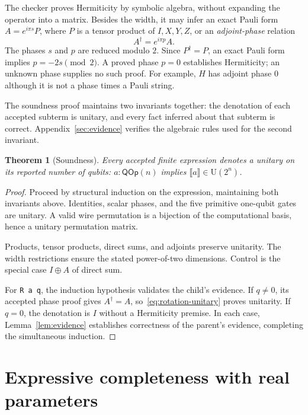 \documentclass[11pt,a4paper]{article}
\newcommand{\U}{\mathrm U}
\newcommand{\sem}[1]{\llbracket #1\rrbracket}
\newcommand{\code}[1]{\texttt{#1}}
\newcommand{\checked}[2]{#1\mathbin{:}\mathsf{QOp}(#2)}
\newtheorem{theorem}{Theorem}
\begin{document}
The checker proves Hermiticity by symbolic algebra, without expanding
the operator into a matrix. Besides the width, it may infer an exact
Pauli form $A=e^{i\pi s}P$, where $P$ is a tensor product of $I,X,Y,Z$,
or an \emph{adjoint-phase} relation
\begin{equation}
  A^\dagger=e^{i\pi p}A.
  \label{eq:adjoint-phase}
\end{equation}
The phases $s$ and $p$ are reduced modulo $2$. Since $P^\dagger=P$,
an exact Pauli form implies $p=-2s\pmod2$. A proved phase $p=0$
establishes Hermiticity; an unknown phase supplies no such proof.
For example, $H$ has adjoint phase $0$ although it is not a phase times
a Pauli string.

The soundness proof maintains two invariants together: the denotation
of each accepted subterm is unitary, and every fact inferred about that
subterm is correct. Appendix~\ref{sec:evidence} verifies the algebraic
rules used for the second invariant.

\begin{theorem}[Soundness]
Every accepted finite expression denotes a unitary on its reported
number of qubits: $\checked a n$ implies $\sem a\in\U(2^n)$.
\label{thm:soundness}
\end{theorem}
\begin{proof}
Proceed by structural induction on the expression, maintaining both
invariants above.
Identities, scalar phases, and the five primitive one-qubit gates are
unitary. A valid wire permutation is a bijection of the computational
basis, hence a unitary permutation matrix.

Products, tensor products, direct sums, and adjoints preserve
unitarity. The width restrictions ensure the stated power-of-two
dimensions. Control is the special case $I\oplus A$ of direct sum.

For \code{R a q}, the induction hypothesis validates the child's
evidence. If $q\ne0$, its accepted phase proof gives $A^\dagger=A$,
so~\eqref{eq:rotation-unitary} proves unitarity. If $q=0$, the
denotation is $I$ without a Hermiticity premise.
In each case, Lemma~\ref{lem:evidence} establishes correctness of the
parent's evidence, completing the simultaneous induction.
\end{proof}

\clearpage
\section{Expressive completeness with real parameters}
\end{document}
